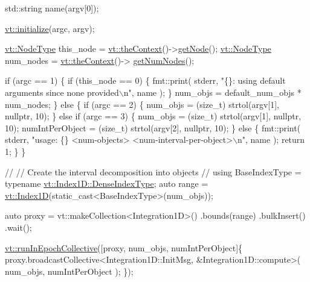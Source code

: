 \begin{DoxyCodeInclude}
  std::string name(argv[0]);

  \hyperlink{namespacevt_aaa266774ea8339c58be0202b00fafa62}{vt::initialize}(argc, argv);

  \hyperlink{namespacevt_a866da9d0efc19c0a1ce79e9e492f47e2}{vt::NodeType} this\_node = \hyperlink{namespacevt_a26551fe0e6e6a1371111df5b12c7e92c}{vt::theContext}()->\hyperlink{structvt_1_1ctx_1_1_context_a0d52c263ce8516546a67443d9a86fa5f}{getNode}();
  \hyperlink{namespacevt_a866da9d0efc19c0a1ce79e9e492f47e2}{vt::NodeType} num\_nodes = \hyperlink{namespacevt_a26551fe0e6e6a1371111df5b12c7e92c}{vt::theContext}()->
      \hyperlink{structvt_1_1ctx_1_1_context_a7f41071aadf6d5fa9e1b6c703c5ff19d}{getNumNodes}();

  \textcolor{keywordflow}{if} (argc == 1) \{
    \textcolor{keywordflow}{if} (this\_node == 0) \{
      fmt::print(
        stderr, \textcolor{stringliteral}{"\{\}: using default arguments since none provided\(\backslash\)n"}, name
      );
    \}
    num\_objs = default\_num\_objs * num\_nodes;
  \} \textcolor{keywordflow}{else} \{
    \textcolor{keywordflow}{if} (argc == 2) \{
      num\_objs = (size\_t) strtol(argv[1], \textcolor{keyword}{nullptr}, 10);
    \}
    \textcolor{keywordflow}{else} \textcolor{keywordflow}{if} (argc == 3) \{
      num\_objs = (size\_t) strtol(argv[1], \textcolor{keyword}{nullptr}, 10);
      numIntPerObject = (size\_t) strtol(argv[2], \textcolor{keyword}{nullptr}, 10);
    \}
    \textcolor{keywordflow}{else} \{
      fmt::print(
        stderr,
        \textcolor{stringliteral}{"usage: \{\} <num-objects> <num-interval-per-object>\(\backslash\)n"}, name
      );
      \textcolor{keywordflow}{return} 1;
    \}
  \}

  \textcolor{comment}{//}
  \textcolor{comment}{// Create the interval decomposition into objects}
  \textcolor{comment}{//}
  \textcolor{keyword}{using} BaseIndexType = \textcolor{keyword}{typename} \hyperlink{structvt_1_1index_1_1_dense_index_array_a36698427e28045290d1fb072573275ec}{vt::Index1D::DenseIndexType};
  \textcolor{keyword}{auto} range = \hyperlink{namespacevt_a5540efc78234273e1796fb003fe4d234}{vt::Index1D}(static\_cast<BaseIndexType>(num\_objs));

  \textcolor{keyword}{auto} proxy = vt::makeCollection<Integration1D>()
    .bounds(range)
    .bulkInsert()
    .wait();

  \hyperlink{namespacevt_a2fc4ef34f30b49a1781d765804bfadbb}{vt::runInEpochCollective}([proxy, num\_objs, numIntPerObject]\{
    proxy.broadcastCollective<Integration1D::InitMsg, &Integration1D::compute>(
      num\_objs, numIntPerObject
    );
  \});


\end{DoxyCodeInclude}
